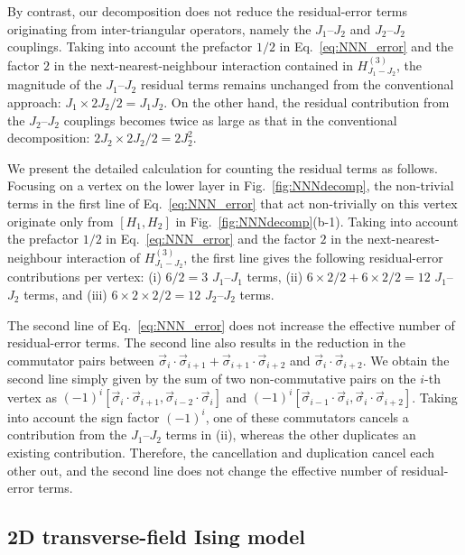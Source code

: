 \documentclass[aps,showpacs,amsmath,amssymb,twocolumn,prx,longbibliography,superscriptaddress,notitlepage,floatfix,10pt]{revtex4-2}
\begin{document}
By contrast, our decomposition does not reduce the residual-error terms originating from inter-triangular operators, namely the $J_{1}$--$J_{2}$ and $J_{2}$--$J_{2}$ couplings. 
Taking into account the prefactor $1/2$ in Eq.~\eqref{eq:NNN_error} and the factor $2$ in the next-nearest-neighbour interaction contained in $H_{J_{1}-J_{2}}^{(3)}$, the magnitude of the $J_{1}$--$J_{2}$ residual terms remains unchanged from the conventional approach:
$    J_{1}\times 2J_{2} /2 = J_{1}J_{2}$.
On the other hand, the residual contribution from the $J_{2}$--$J_{2}$ couplings becomes twice as large as that in the conventional decomposition:
    $2J_{2}\times 2J_{2} /2 = 2J_{2}^2$.

We present the detailed calculation for counting the residual terms as follows.
Focusing on a vertex on the lower layer in Fig.~\ref{fig:NNNdecomp}, the non-trivial terms in the first line of Eq.~\eqref{eq:NNN_error} that act non-trivially on this vertex originate only from $[H_{1},H_{2}]$ in Fig.~\ref{fig:NNNdecomp}(b-1). 
Taking into account the prefactor $1/2$ in Eq.~\eqref{eq:NNN_error} and the factor $2$ in the next-nearest-neighbour interaction of $H_{J_{1}-J_{2}}^{(3)}$, the first line gives the following residual-error contributions per vertex:
(i) $6/2=3$ $J_{1}$--$J_{1}$ terms,
(ii) $6\times2/2+6\times2/2=12$ $J_{1}$--$J_{2}$ terms,
and
(iii) $6\times2\times2/2=12$ $J_{2}$--$J_{2}$ terms.

The second line of Eq.~\eqref{eq:NNN_error} does not increase the effective number of residual-error terms. The second line also results in the reduction in the commutator pairs between $\vec{\sigma}_{i}\cdot\vec{\sigma}_{i+1}+\vec{\sigma}_{i+1}\cdot\vec{\sigma}_{i+2}$ and $\vec{\sigma}_{i}\cdot\vec{\sigma}_{i+2}$. We obtain the second line simply given by the sum of two non-commutative pairs on the $i$-th vertex as $(-1)^i[\vec{\sigma}_{i}\cdot\vec{\sigma}_{i+1},\vec{\sigma}_{i-2}\cdot\vec{\sigma}_{i}]$ and $(-1)^i[\vec{\sigma}_{i-1}\cdot\vec{\sigma}_{i},\vec{\sigma}_{i}\cdot\vec{\sigma}_{i+2}]$. Taking into account the sign factor $(-1)^i$, one of these commutators cancels a contribution from the $J_{1}$--$J_{2}$ terms in (ii), whereas the other duplicates an existing contribution. 
Therefore, the cancellation and duplication cancel each other out, and the second line does not change the effective number of residual-error terms.


\subsection{2D transverse-field Ising model}
\end{document}
